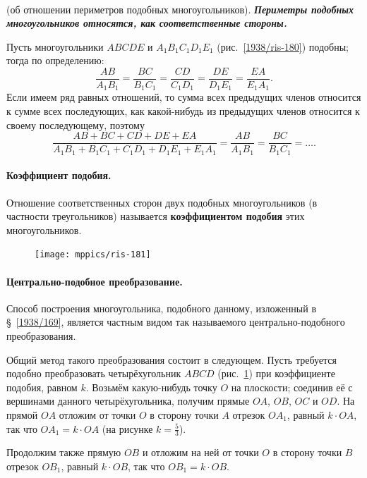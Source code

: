 \documentclass[oneside]{book}
\makeatletter
\newcommand{\rindex}[2][\imki@jobname]{%
  \index[#1]{\detokenize{#2}}%
}
\makeatother
\begin{document}
\paragraph{}\label{1938/172}
 (об отношении периметров подобных многоугольников).
\textbf{\emph{Периметры подобных многоугольников относятся, как соответственные стороны.}}

Пусть многоугольники $ABCDE$ и $A_1B_1C_1D_1E_1$ (рис.~\ref{1938/ris-180}) подобны;
тогда по определению: %
\[\frac{AB}{A_1B_1}=\frac{BC}{B_1C_1}=\frac{CD}{C_1D_1}=\frac{DE}{D_1E_1}=\frac{EA}{E_1A_1}.\]
Если имеем ряд равных отношений, то сумма всех предыдущих членов относится к сумме всех последующих, как какой-нибудь из предыдущих членов относится к своему последующему, поэтому
\[\frac{AB+BC+CD+DE+EA}{A_1B_1+B_1C_1+C_1D_1+D_1E_1+E_1A_1}=\frac{AB}{A_1B_1}=\frac{BC}{B_1C_1}=\dots.\]


\paragraph{Коэффициент подобия.}\label{1938/173}
Отношение соответственных сторон двух подобных многоугольников (в частности  треугольников) называется \rindex{коэффициент подобия}\textbf{коэффициентом подобия} этих многоугольников.

\begin{figure}
\centering
\texttt{[image: mppics/ris-181]}
\caption{}\label{1938/ris-181}
\end{figure}

\paragraph{Центрально-подобное преобразование.}\label{1938/174}
Способ построения многоугольника, подобного данному, изложенный в §~\ref{1938/169}, является частным видом так называемого центрально-подобного преобразования.

Общий метод такого преобразования состоит в следующем.
Пусть требуется подобно преобразовать четырёхугольник $ABCD$ (рис.~\ref{1938/ris-181}) при коэффициенте подобия, равном $k$.
Возьмём какую-нибудь точку $O$ на плоскости;
соединив её с вершинами данного четырёхугольника, получим прямые $OA$, $OB$, $OC$ и $OD$.
На прямой $OA$ отложим от точки $O$ в сторону точки $A$ отрезок $OA_1$, равный $k\cdot OA$, так что $OA_1=k\cdot OA$ (на рисунке $k=\tfrac53$).

Продолжим также прямую $OB$ и отложим на ней от точки $O$ в сторону точки $B$ отрезок $OB_1$, равный $k\cdot OB$, так что $OB_1=k\cdot OB$.
\end{document}

